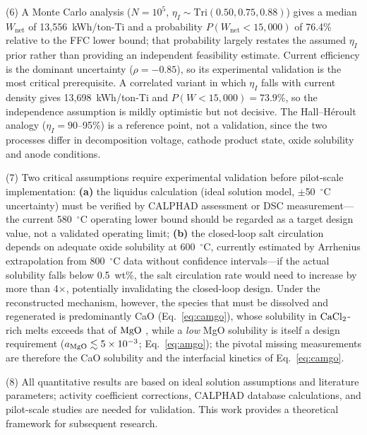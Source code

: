 \documentclass[pdflatex,sn-basic,Numbered]{sn-jnl}
\begin{document}
(6) A Monte Carlo analysis ($N = 10^5$, $\eta_I \sim \mathrm{Tri}(0.50, 0.75, 0.88)$) gives a median $W_{\mathrm{net}}$ of 13{,}556~kWh/ton-Ti and a probability $P(W_{\mathrm{net}} < 15{,}000)$ of 76.4\% relative to the FFC lower bound; that probability largely restates the assumed $\eta_I$ prior rather than providing an independent feasibility estimate. Current efficiency is the dominant uncertainty ($\rho = -0.85$), so its experimental validation is the most critical prerequisite. A correlated variant in which $\eta_I$ falls with current density gives 13{,}698~kWh/ton-Ti and $P(W < 15{,}000) = 73.9\%$, so the independence assumption is mildly optimistic but not decisive. The Hall--H\'eroult analogy ($\eta_I = 90$--95\%) \cite{kvande2014} is a reference point, not a validation, since the two processes differ in decomposition voltage, cathode product state, oxide solubility and anode conditions.

(7) Two critical assumptions require experimental validation before pilot-scale implementation: \textbf{(a)} the liquidus calculation (ideal solution model, $\pm$50~$^{\circ}$C uncertainty) must be verified by CALPHAD assessment or DSC measurement---the current 580~$^{\circ}$C operating lower bound should be regarded as a target design value, not a validated operating limit; \textbf{(b)} the closed-loop salt circulation depends on adequate oxide solubility at 600~$^{\circ}$C, currently estimated by Arrhenius extrapolation from 800~$^{\circ}$C data without confidence intervals---if the actual solubility falls below 0.5~wt\%, the salt circulation rate would need to increase by more than 4$\times$, potentially invalidating the closed-loop design. Under the reconstructed mechanism, however, the species that must be dissolved and regenerated is predominantly CaO (Eq.~\ref{eq:camgo}), whose solubility in $\ce{CaCl2}$-rich melts exceeds that of $\ce{MgO}$ \cite{wang2008cao}, while a \emph{low} MgO solubility is itself a design requirement ($a_{\ce{MgO}} \lesssim 5\times10^{-3}$; Eq.~\ref{eq:amgo}); the pivotal missing measurements are therefore the CaO solubility and the interfacial kinetics of Eq.~\ref{eq:camgo}.

(8) All quantitative results are based on ideal solution assumptions and literature parameters; activity coefficient corrections, CALPHAD database calculations, and pilot-scale studies are needed for validation. This work provides a theoretical framework for subsequent research.
\end{document}
